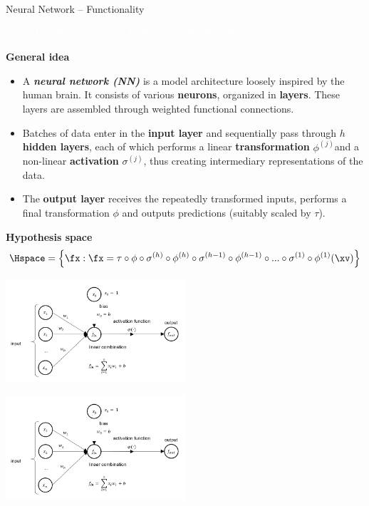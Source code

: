 \documentclass[11pt,compress,t,notes=noshow, xcolor=table]{beamer}
\newcommand{\bfit}[1]{\textbf{\textit{#1}}}
\newcommand{\maketag}[1]{\colorbox{highlightcol}{\textcolor{white}
{\MakeUppercase{#1}}}}
\newcommand{\highlight}[1]{\textcolor{highlightcol}{\textbf{#1}}}
\begin{document}
\begin{frame}{Neural Network -- Functionality}

\footnotesize

\maketag{|UN| SUPERVISED}
\maketag{|Non| parametric}
\maketag{BLACK-BOX}

\medskip

\highlight{General idea}
\begin{itemize}
  \item A \bfit{neural network (NN)} is a model architecture loosely inspired by 
  the human brain. It consists of various \textbf{neurons}, organized in 
  \textbf{layers}. These layers are assembled through weighted functional 
  connections. 
  \item Batches of data enter in the \textbf{input layer} and sequentially pass 
  through $h$ \textbf{hidden layers}, each of which performs a linear 
  \textbf{transformation} $\phi^{(j)}$and a non-linear \textbf{activation} 
  $\sigma^{(j)}$, thus creating intermediary representations of the data.
  \item The \textbf{output layer} receives the repeatedly transformed inputs, 
  performs a final transformation $\phi $ and outputs predictions (suitably 
  scaled by $\tau$).
\end{itemize}

\medskip
 
\highlight{Hypothesis space} ~~
$$\Hspace = \left\{ \fx: \fx = \tau \circ \phi \circ \sigma^{(h)} \circ
\phi^{(h)} \circ \sigma^{(h - 1)} \circ \phi^{(h - 1)} \circ ... \circ 
\sigma^{(1)} \circ \phi^{(1)} (\xv) \right\}$$

\medskip

\begin{minipage}{0.5\textwidth}
  \includegraphics[width=0.5\textwidth]{figure/nn_neuron.PNG}
\end{minipage}%
\begin{minipage}{0.5\textwidth}
  \includegraphics[width=0.5\textwidth]{figure/nn_neuron.PNG}
\end{minipage}

\end{frame}
\end{document}
